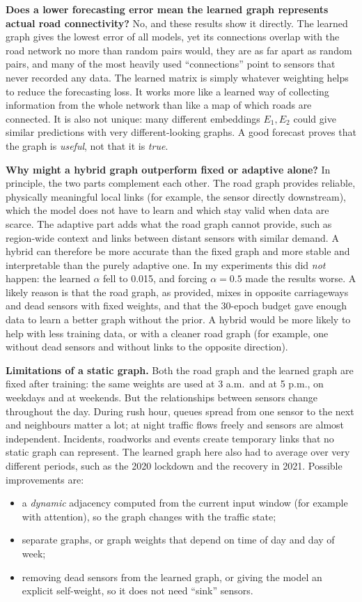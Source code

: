 \documentclass[11pt, a4paper]{article}
\begin{document}
\textbf{Does a lower forecasting error mean the learned graph represents actual road connectivity?} No, and these results show it directly. The learned graph gives the lowest error of all models, yet its connections overlap with the road network no more than random pairs would, they are as far apart as random pairs, and many of the most heavily used ``connections'' point to sensors that never recorded any data. The learned matrix is simply whatever weighting helps to reduce the forecasting loss. It works more like a learned way of collecting information from the whole network than like a map of which roads are connected. It is also not unique: many different embeddings $E_1, E_2$ could give similar predictions with very different-looking graphs. A good forecast proves that the graph is \emph{useful}, not that it is \emph{true}.

\textbf{Why might a hybrid graph outperform fixed or adaptive alone?} In principle, the two parts complement each other. The road graph provides reliable, physically meaningful local links (for example, the sensor directly downstream), which the model does not have to learn and which stay valid when data are scarce. The adaptive part adds what the road graph cannot provide, such as region-wide context and links between distant sensors with similar demand. A hybrid can therefore be more accurate than the fixed graph and more stable and interpretable than the purely adaptive one. In my experiments this did \emph{not} happen: the learned $\alpha$ fell to 0.015, and forcing $\alpha = 0.5$ made the results worse. A likely reason is that the road graph, as provided, mixes in opposite carriageways and dead sensors with fixed weights, and that the 30-epoch budget gave enough data to learn a better graph without the prior. A hybrid would be more likely to help with less training data, or with a cleaner road graph (for example, one without dead sensors and without links to the opposite direction).

\textbf{Limitations of a static graph.} Both the road graph and the learned graph are fixed after training: the same weights are used at 3 a.m.\ and at 5 p.m., on weekdays and at weekends. But the relationships between sensors change throughout the day. During rush hour, queues spread from one sensor to the next and neighbours matter a lot; at night traffic flows freely and sensors are almost independent. Incidents, roadworks and events create temporary links that no static graph can represent. The learned graph here also had to average over very different periods, such as the 2020 lockdown and the recovery in 2021. Possible improvements are:
\begin{itemize}
\item a \emph{dynamic} adjacency computed from the current input window (for example with attention), so the graph changes with the traffic state;
\item separate graphs, or graph weights that depend on time of day and day of week;
\item removing dead sensors from the learned graph, or giving the model an explicit self-weight, so it does not need ``sink'' sensors.
\end{itemize}
\end{document}
